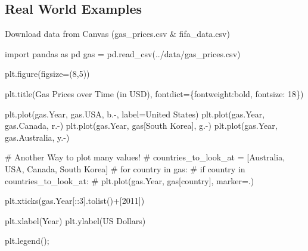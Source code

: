 \documentclass[
  letterpaper,
  DIV=11,
  numbers=noendperiod]{scrreprt}
\newenvironment{Shaded}{\begin{snugshade}}{\end{snugshade}}
\newcommand{\CommentTok}[1]{\textcolor[rgb]{0.37,0.37,0.37}{#1}}
\newcommand{\DecValTok}[1]{\textcolor[rgb]{0.68,0.00,0.00}{#1}}
\newcommand{\ImportTok}[1]{\textcolor[rgb]{0.00,0.46,0.62}{#1}}
\newcommand{\NormalTok}[1]{\textcolor[rgb]{0.00,0.23,0.31}{#1}}
\newcommand{\OperatorTok}[1]{\textcolor[rgb]{0.37,0.37,0.37}{#1}}
\newcommand{\StringTok}[1]{\textcolor[rgb]{0.13,0.47,0.30}{#1}}
\begin{document}
\hypertarget{real-world-examples}{%
\subsection{Real World Examples}\label{real-world-examples}}

Download data from Canvas (gas\_prices.csv \& fifa\_data.csv)

\begin{Shaded}
\begin{Highlighting}[]
\ImportTok{import}\NormalTok{ pandas }\ImportTok{as}\NormalTok{ pd}
\NormalTok{gas }\OperatorTok{=}\NormalTok{ pd.read\_csv(}\StringTok{\textquotesingle{}../data/gas\_prices.csv\textquotesingle{}}\NormalTok{)}

\NormalTok{plt.figure(figsize}\OperatorTok{=}\NormalTok{(}\DecValTok{8}\NormalTok{,}\DecValTok{5}\NormalTok{))}

\NormalTok{plt.title(}\StringTok{\textquotesingle{}Gas Prices over Time (in USD)\textquotesingle{}}\NormalTok{, fontdict}\OperatorTok{=}\NormalTok{\{}\StringTok{\textquotesingle{}fontweight\textquotesingle{}}\NormalTok{:}\StringTok{\textquotesingle{}bold\textquotesingle{}}\NormalTok{, }\StringTok{\textquotesingle{}fontsize\textquotesingle{}}\NormalTok{: }\DecValTok{18}\NormalTok{\})}

\NormalTok{plt.plot(gas.Year, gas.USA, }\StringTok{\textquotesingle{}b.{-}\textquotesingle{}}\NormalTok{, label}\OperatorTok{=}\StringTok{\textquotesingle{}United States\textquotesingle{}}\NormalTok{)}
\NormalTok{plt.plot(gas.Year, gas.Canada, }\StringTok{\textquotesingle{}r.{-}\textquotesingle{}}\NormalTok{)}
\NormalTok{plt.plot(gas.Year, gas[}\StringTok{\textquotesingle{}South Korea\textquotesingle{}}\NormalTok{], }\StringTok{\textquotesingle{}g.{-}\textquotesingle{}}\NormalTok{)}
\NormalTok{plt.plot(gas.Year, gas.Australia, }\StringTok{\textquotesingle{}y.{-}\textquotesingle{}}\NormalTok{)}

\CommentTok{\# Another Way to plot many values!}
\CommentTok{\# countries\_to\_look\_at = [\textquotesingle{}Australia\textquotesingle{}, \textquotesingle{}USA\textquotesingle{}, \textquotesingle{}Canada\textquotesingle{}, \textquotesingle{}South Korea\textquotesingle{}]}
\CommentTok{\# for country in gas:}
\CommentTok{\#     if country in countries\_to\_look\_at:}
\CommentTok{\#         plt.plot(gas.Year, gas[country], marker=\textquotesingle{}.\textquotesingle{})}

\NormalTok{plt.xticks(gas.Year[::}\DecValTok{3}\NormalTok{].tolist()}\OperatorTok{+}\NormalTok{[}\DecValTok{2011}\NormalTok{])}

\NormalTok{plt.xlabel(}\StringTok{\textquotesingle{}Year\textquotesingle{}}\NormalTok{)}
\NormalTok{plt.ylabel(}\StringTok{\textquotesingle{}US Dollars\textquotesingle{}}\NormalTok{)}

\NormalTok{plt.legend()}\OperatorTok{;}
\end{Highlighting}
\end{Shaded}
\end{document}
